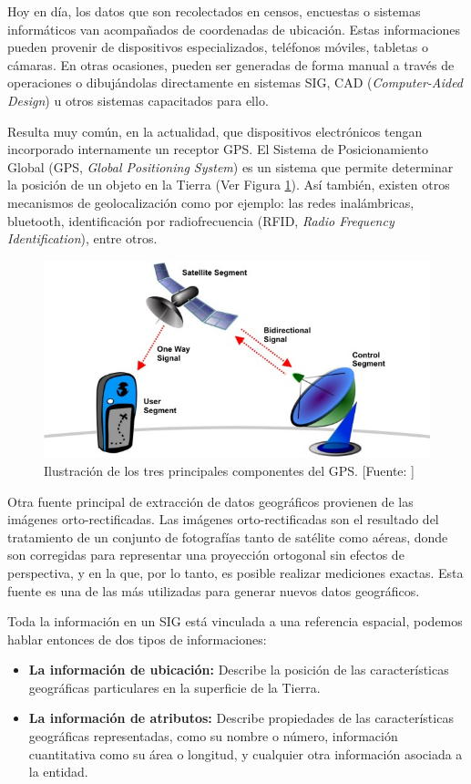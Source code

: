 Hoy en día, los datos que son recolectados en censos, encuestas o sistemas informáticos van acompañados de coordenadas de ubicación. Estas informaciones pueden provenir de dispositivos especializados, teléfonos móviles, tabletas o cámaras. En otras ocasiones, pueden ser generadas de forma manual a través de operaciones o dibujándolas directamente en sistemas SIG, CAD (\textit{Computer-Aided Design}) u otros sistemas capacitados para ello.

Resulta muy común, en la actualidad, que dispositivos electrónicos tengan incorporado internamente un receptor GPS. El Sistema de Posicionamiento Global (GPS, \textit{Global Positioning System}) es un sistema que permite determinar la posición de un objeto en la Tierra (Ver Figura \ref{fig:gps}). Así también, existen otros mecanismos de geolocalización como por ejemplo: las redes inalámbricas, bluetooth, identificación por radiofrecuencia (RFID, \textit{Radio Frequency Identification}), entre otros.

\begin{figure}[H]
    \centering
    \includegraphics[width=11.5cm]{gps.jpg}
    \caption{Ilustración de los tres principales componentes del GPS. [Fuente: \citet{Hinch2010OutdoorGps}]}
    \label{fig:gps}
\end{figure}

Otra fuente principal de extracción de datos geográficos provienen de las imágenes orto-rectificadas. Las imágenes orto-rectificadas son el resultado del tratamiento de un conjunto de fotografías tanto de satélite como aéreas, donde son corregidas para representar una proyección ortogonal sin efectos de perspectiva, y en la que, por lo tanto, es posible realizar mediciones exactas. Esta fuente es una de las más utilizadas para generar nuevos datos geográficos.

Toda la información en un SIG está vinculada a una referencia espacial, podemos hablar entonces de dos tipos de informaciones: 
\begin{itemize}
    \item \textbf{La información de ubicación:} 
    Describe la posición de las características geográficas particulares en la superficie de la Tierra.
    \item \textbf{La información de atributos:} 
    Describe propiedades de las características geográficas representadas, como su nombre o número, información cuantitativa como su área o longitud, y cualquier otra información asociada a la entidad.
\end{itemize}

